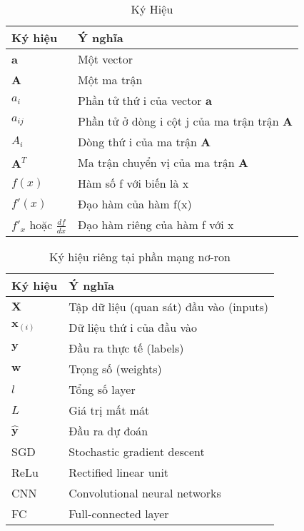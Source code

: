 \begin{table}[]
\caption{Ký Hiệu}
\label{my-label}
\renewcommand{\arraystretch}{2}
\hspace*{20mm}
\begin{tabular}{p{3cm} p{10cm} }
Ký hiệu & Ý nghĩa\\
\hline
\textbf{a}                                   & Một vector                                           \\
\textbf{A}                                   & Một ma trận                                          \\
$a_{i}$                                      & Phần tử thứ i của vector $\textbf{a}$                \\
$a_{ij}$                                     & Phần tử ở dòng i cột j của ma trận trận $\textbf{A}$ \\
$A_{i}$                                      & Dòng thứ i của ma trận $\textbf{A}$                  \\
$\textbf{A}^T$ & Ma trận chuyển vị của ma trận $\textbf{A}$           \\
$f(x)$                                       & Hàm số f với biến là x                               \\
$f'(x)$                              & Đạo hàm của hàm f(x)                                 \\
$\displaystyle f'_{x} $ hoặc $\displaystyle \frac{df}{dx} $ & Đạo hàm riêng của  hàm f với x                       \\

\end{tabular}
\end{table}


\begin{table}[]

\caption{Ký hiệu riêng tại phần mạng nơ-ron}
\label{my-label}
\renewcommand{\arraystretch}{2}
\hspace*{20mm}
\begin{tabular}{p{3cm} p{10cm} }
Ký hiệu & Ý nghĩa\\
\hline
$\textbf{X}$ 	& Tập dữ liệu (quan sát) đầu vào (inputs)\\
$\textbf{x}_{(i)}$ 	& Dữ liệu thứ i của đầu vào \\
$\textbf{y}$	& Đầu ra thực tế (labels)\\
$\textbf{w}$ & Trọng số (weights) \\
$l$ 	& Tổng số layer\\
$L$		& Giá trị mất mát\\ 
$\widehat{\textbf{y}}$ & Đầu ra dự đoán\\
SGD & Stochastic gradient descent \\
ReLu	& Rectified linear unit \\
CNN 	& Convolutional neural networks\\
FC	& Full-connected layer


\end{tabular}

\end{table}

